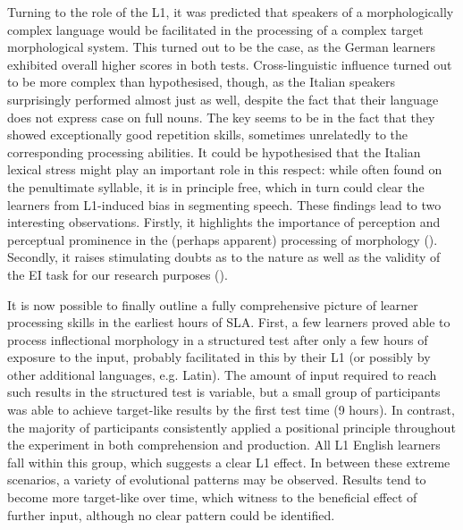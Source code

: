 Turning to the role of the L1, it was predicted that speakers of a morphologically complex language would be facilitated in the processing of a complex target morphological system. This turned out to be the case, as the German learners exhibited overall higher scores in both tests. Cross-linguistic influence turned out to be more complex than hypothesised, though, as the Italian speakers surprisingly performed almost just as well, despite the fact that their language does not express case on full nouns. The key seems to be in the fact that they showed exceptionally good repetition skills, sometimes unrelatedly to the corresponding processing abilities. It could be hypothesised that the Italian lexical stress might play an important role in this respect: while often found on the penultimate syllable, it is in principle free, which in turn could clear the learners from L1-induced bias in segmenting speech. These findings lead to two interesting observations. Firstly, it highlights the importance of perception and perceptual prominence in the (perhaps apparent) processing of morphology (\citealt{GallimoreTharp1981, Peters1985}). Secondly, it raises stimulating doubts as to the nature as well as the validity of the EI task for our research purposes (\citealt{Vinther2002, Erlam2006, VanMoere2012}).

It is now possible to finally outline a fully comprehensive picture of learner processing skills in the earliest hours of SLA. First, a few learners proved able to process inflectional morphology in a structured test after only a few hours of exposure to the input, probably facilitated in this by their L1 (or possibly by other additional languages, e.g. Latin). The amount of input required to reach such results in the structured test is variable, but a small group of participants was able to achieve target-like results by the first test time (9 hours). In contrast, the majority of participants consistently applied a positional principle throughout the experiment in both comprehension and production. All L1 English learners fall within this group, which suggests a clear L1 effect. In between these extreme scenarios, a variety of evolutional patterns may be observed. Results tend to become more target-like over time, which witness to the beneficial effect of further input, although no clear pattern could be identified.

